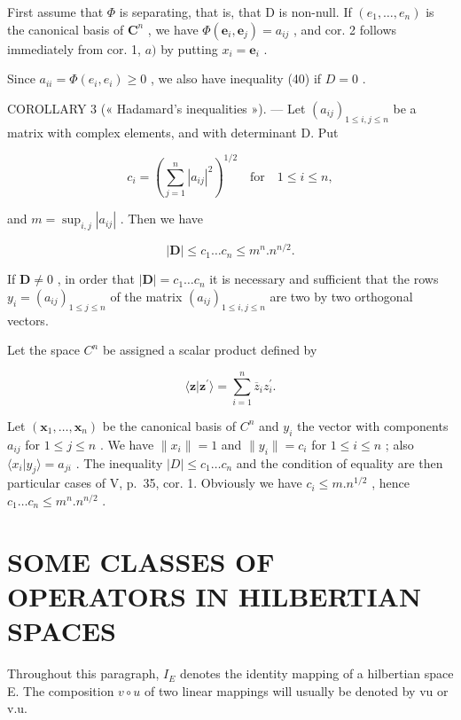 First assume that \(\Phi\) is separating, that is, that D is non-null. If \((e_1, \ldots, e_n)\) is the canonical basis of \(\mathbf{C}^n\) , we have \(\Phi(\mathbf{e}_i, \mathbf{e}_j) = a_{ij}\) , and cor. 2 follows immediately from cor. 1, \(a)\) by putting \(x_i = \mathbf{e}_i\) .

Since \(a_{ii} = \Phi(e_i, e_i) \geqslant 0\) , we also have inequality (40) if \(D = 0\) .

COROLLARY 3 (« Hadamard's inequalities »). --- Let \((a_{ij})_{1 \leqslant i,j \leqslant n}\) be a matrix with complex elements, and with determinant D. Put

\[
c _ {i} = \left(\sum_ {j = 1} ^ {n} | a _ {i j} | ^ {2}\right) ^ {1 / 2} \quad \text {for} \quad 1 \leqslant i \leqslant n,
\]

and \(m = \sup_{i,j}|a_{ij}|\) . Then we have

\[
| \mathbf {D} | \leqslant c _ {1} \dots c _ {n} \leqslant m ^ {n}. n ^ {n / 2}.\tag{41}
\]

If \(\mathbf{D} \neq 0\) , in order that \(|\mathbf{D}| = c_1 \ldots c_n\) it is necessary and sufficient that the rows \(y_i = (a_{ij})_{1 \leqslant j \leqslant n}\) of the matrix \((a_{ij})_{1 \leqslant i,j \leqslant n}\) are two by two orthogonal vectors.

Let the space \(C^{n}\) be assigned a scalar product defined by

\[
\langle \mathbf {z} | \mathbf {z} ^ {\prime} \rangle = \sum_ {i = 1} ^ {n} \overline {{z}} _ {i} z _ {i} ^ {\prime}.
\]

Let \((\mathbf{x}_{1},\ldots,\mathbf{x}_{n})\) be the canonical basis of \(C^{n}\) and \(y_{i}\) the vector with components \(a_{ij}\) for \(1\leqslant j\leqslant n\) . We have \(\|x_{i}\|=1\) and \(\|y_{i}\|=c_{i}\) for \(1\leqslant i\leqslant n\) ; also \(\langle x_{i}|y_{j}\rangle=a_{ji}\) . The inequality \(|D|\leqslant c_{1}\ldots c_{n}\) and the condition of equality are then particular cases of V, p.~35, cor. 1. Obviously we have \(c_{i}\leqslant m.n^{1/2}\) , hence \(c_{1}\ldots c_{n}\leqslant m^{n}.n^{n/2}\) .

\section{SOME CLASSES OF OPERATORS IN HILBERTIAN SPACES}

Throughout this paragraph, \(I_{E}\) denotes the identity mapping of a hilbertian space E. The composition \(v \circ u\) of two linear mappings will usually be denoted by vu or v.u.

